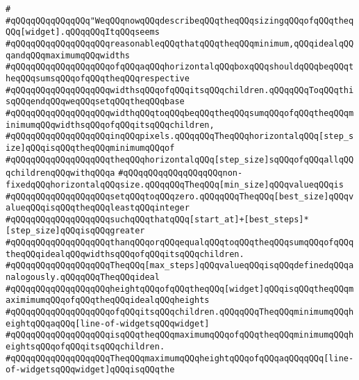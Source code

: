 \verb|#|\newline
\verb|#qQQqqQQqqQQqqQQq"WeqQQqnowqQQqdescribeqQQqtheqQQqsizingqQQqofqQQqtheqQQq[widget].qQQqqQQqItqQQqseems|\newline
\verb|#qQQqqQQqqQQqqQQqqQQqreasonableqQQqthatqQQqtheqQQqminimum,qQQqidealqQQqandqQQqmaximumqQQqwidths|\newline
\verb|#qQQqqQQqqQQqqQQqqQQqofqQQqaqQQqhorizontalqQQqboxqQQqshouldqQQqbeqQQqtheqQQqsumsqQQqofqQQqtheqQQqrespective|\newline
\verb|#qQQqqQQqqQQqqQQqqQQqwidthsqQQqofqQQqitsqQQqchildren.qQQqqQQqToqQQqthisqQQqendqQQqweqQQqsetqQQqtheqQQqbase|\newline
\verb|#qQQqqQQqqQQqqQQqqQQqwidthqQQqtoqQQqbeqQQqtheqQQqsumqQQqofqQQqtheqQQqminimumqQQqwidthsqQQqofqQQqitsqQQqchildren,|\newline
\verb|#qQQqqQQqqQQqqQQqqQQqinqQQqpixels.qQQqqQQqTheqQQqhorizontalqQQq[step_size]qQQqisqQQqtheqQQqminimumqQQqof|\newline
\verb|#qQQqqQQqqQQqqQQqqQQqtheqQQqhorizontalqQQq[step_size]sqQQqofqQQqallqQQqchildrenqQQqwithqQQqa|\newline
\verb|#qQQqqQQqqQQqqQQqqQQqnon-fixedqQQqhorizontalqQQqsize.qQQqqQQqTheqQQq[min_size]qQQqvalueqQQqis|\newline
\verb|#qQQqqQQqqQQqqQQqqQQqsetqQQqtoqQQqzero.qQQqqQQqTheqQQq[best_size]qQQqvalueqQQqisqQQqtheqQQqleastqQQqinteger|\newline
\verb|#qQQqqQQqqQQqqQQqqQQqsuchqQQqthatqQQq[start_at]+[best_steps]*[step_size]qQQqisqQQqgreater|\newline
\verb|#qQQqqQQqqQQqqQQqqQQqthanqQQqorqQQqequalqQQqtoqQQqtheqQQqsumqQQqofqQQqtheqQQqidealqQQqwidthsqQQqofqQQqitsqQQqchildren.|\newline
\verb|#qQQqqQQqqQQqqQQqqQQqTheqQQq[max_steps]qQQqvalueqQQqisqQQqdefinedqQQqanalogously.qQQqqQQqTheqQQqideal|\newline
\verb|#qQQqqQQqqQQqqQQqqQQqheightqQQqofqQQqtheqQQq[widget]qQQqisqQQqtheqQQqmaximimumqQQqofqQQqtheqQQqidealqQQqheights|\newline
\verb|#qQQqqQQqqQQqqQQqqQQqofqQQqitsqQQqchildren.qQQqqQQqTheqQQqminimumqQQqheightqQQqaqQQq[line-of-widgetsqQQqwidget]|\newline
\verb|#qQQqqQQqqQQqqQQqqQQqisqQQqtheqQQqmaximumqQQqofqQQqtheqQQqminimumqQQqheightsqQQqofqQQqitsqQQqchildren.|\newline
\verb|#qQQqqQQqqQQqqQQqqQQqTheqQQqmaximumqQQqheightqQQqofqQQqaqQQqqQQq[line-of-widgetsqQQqwidget]qQQqisqQQqthe|\newline
